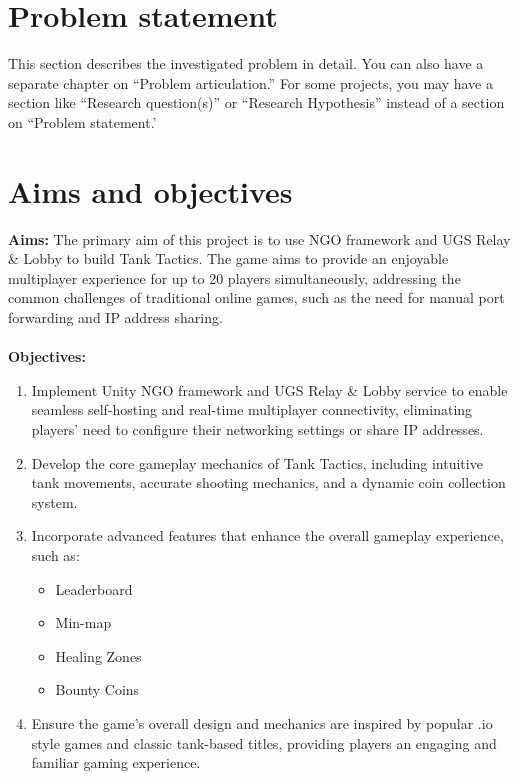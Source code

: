 \section{Problem statement}
\label{sec:intro_prob_art}
This section describes the investigated problem in detail. You can also have a separate chapter on ``Problem articulation.''  For some projects, you may have a section like ``Research question(s)'' or ``Research Hypothesis'' instead of a section on ``Problem statement.'

\section{Aims and objectives}
\label{sec:intro_aims_obj}

\textbf{Aims:} The primary aim of this project is to use NGO framework and UGS Relay \& Lobby to build Tank Tactics. The game aims to provide an enjoyable multiplayer experience for up to 20 players simultaneously, addressing the common challenges of traditional online games, such as the need for manual port forwarding and IP address sharing.\\
\\
\textbf{Objectives:}
\begin{enumerate}
    \item Implement Unity NGO framework and UGS Relay \& Lobby service to enable seamless self-hosting and real-time multiplayer connectivity, eliminating players' need to configure their networking settings or share IP addresses.
    \item Develop the core gameplay mechanics of Tank Tactics, including intuitive tank movements, accurate shooting mechanics, and a dynamic coin collection system.
    \item Incorporate advanced features that enhance the overall gameplay experience, such as:
    \begin{itemize}
        \item Leaderboard
        \item Min-map
        \item Healing Zones
        \item Bounty Coins
    \end{itemize}
    \item Ensure the game's overall design and mechanics are inspired by popular .io style games and classic tank-based titles, providing players an engaging and familiar gaming experience.
\end{enumerate}



